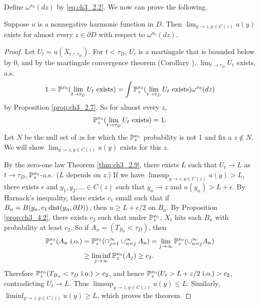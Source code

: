 
Define $\omega^{x_0}(dz)$ by \eqref{eq:ch3_2.2}. We now can prove the following.

\begin{theorem}\label{thm:ch3_4.3}
Suppose $u$ is a nonnegative harmonic function in $D$. Then $\lim_{y \to z,y \in C(z)} u(y)$ exists for almost every $z \in \partial D$ with respect to $\omega^{x_0}(dz)$.
\end{theorem}

\begin{proof}
Let $U_t = u(X_{t \wedge \tau_D})$. For $t < \tau_D$, $U_t$ is a martingale that is bounded below by $0$, and by the martingale convergence theorem (Corollary ), $\lim_{t \to \tau_D} U_t$ exists, a.s.
\[
    1 = \P^{x_0}(\lim_{t \to \tau_D} U_t~\text{exists}) = \int \P_z^{x_0}(\lim_{t \to \tau_D} U_t~\text{exists})\omega^{x_0}(dz)
\]
by Proposition \ref{prop:ch3_2.7}. So for almost every $z$,
\[
    \P_z^{x_0}(\lim_{t \to \tau_D} U_t\text{~exists}) = 1.
\]
Let $N$ be the null set of $z$s for which the $\P_z^{x_0}$ probability is not 1 and fix a $z \not\in N$. We will show $\lim_{y \to z,y \in C(z)} u(y)$ exists for this $z$.

By the zero-one law Theorem \ref{thm:ch3_2.9}, there exists $L$ such that $U_t \to L$ as $t \to \tau_D$, $\P_z^{x_0}$-a.s.\ ($L$ depends on $z$.) If we have $\limsup_{y \to z,y \in C(z)} u(y) > L$, there exists $\epsilon$ and $y_1,y_2,\ldots \in C(z)$ such that $y_n \to z$ and $u(y_n) > L + \epsilon$. By Harnack's inequality, there exists $c_1$ small such that if $B_n = B(y_n,c_1\dist(y_n,\partial D))$, then $u \geq L + \epsilon/2$ on $B_n$. By Proposition \ref{prop:ch3_4.2}, there exists $c_2$ such that under $\P_z^{x_0}$, $X_t$ hits each $B_n$ with probability at least $c_2$. So if $A_n = (T_{B_n} < \tau_D)$, then
\begin{align*}
    \P_z^{x_0}(A_n~\text{i.o.}) &= \P_z^{x_0}(\cap_{j=1}^\infty \cup_{n=j}^\infty A_n) = \lim_{j \to \infty} \P_z^{x_0}(\cup_{n=j}^\infty A_n) \\
    &\geq \liminf_{j \to \infty} \P_z^{x_0}(A_j) \geq c_2.
\end{align*}
Therefore $\P_z^{x_0}(T_{B_n} < \tau_D~\text{i.o.}) > c_2$, and hence $\P_z^{x_0}(U_t > L + \epsilon/2~\text{i.o.}) > c_2$, contradicting $U_t \to L$. Thus $\limsup_{y \to z,y \in C(z)} u(y) \leq L$. Similarly, $\liminf_{y \to z,y \in C(z)} u(y) \geq L$, which proves the theorem.
\end{proof}

